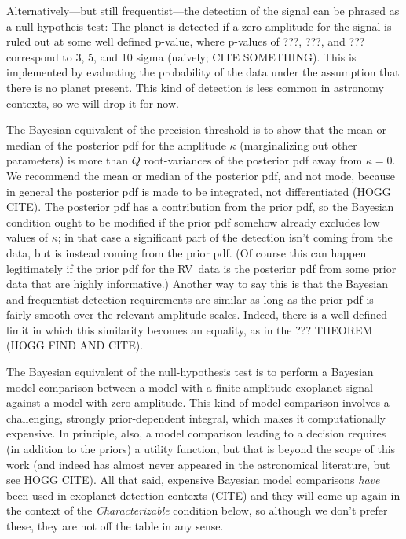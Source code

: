 \documentclass[modern]{aastex63}
\newcommand{\acronym}[1]{{\small{#1}}}
\newcommand{\rv}{\acronym{RV}}
\begin{document}
Alternatively---but still frequentist---the detection of the signal
can be phrased as a null-hypotheis test: The planet is detected if a
zero amplitude for the signal is ruled out at some well defined
p-value, where p-values of ???, ???, and ??? correspond to 3, 5, and
10 sigma (naively; CITE SOMETHING).
This is implemented by evaluating the probability of the data under
the assumption that there is no planet present.
This kind of detection is less common in astronomy contexts, so we will
drop it for now.

The Bayesian equivalent of the precision threshold is to show that the
mean or median of the posterior pdf for the amplitude $\kappa$
(marginalizing out other parameters) is more than $Q$ root-variances
of the posterior pdf away from $\kappa=0$.
We recommend the mean or median of the posterior pdf, and not mode,
because in general the posterior pdf is made to be integrated, not
differentiated (HOGG CITE).
The posterior pdf has a contribution from the prior pdf, so the Bayesian
condition ought to be modified if the prior pdf somehow already excludes
low values of $\kappa$; in that case a significant part of the detection
isn't coming from the data, but is instead coming from the prior pdf.
(Of course this can happen legitimately if the prior pdf for the \rv\ data
is the posterior pdf from some prior data that are highly informative.)
Another way to say this is that the Bayesian and frequentist detection
requirements are similar as long as the prior pdf is fairly smooth over
the relevant amplitude scales.
Indeed, there is a well-defined limit in which this similarity becomes
an equality, as in the ??? THEOREM (HOGG FIND AND CITE).

The Bayesian equivalent of the null-hypothesis test is to perform a
Bayesian model comparison between a model with a finite-amplitude
exoplanet signal against a model with zero amplitude.
This kind of model comparison involves a challenging, strongly
prior-dependent integral, which makes it computationally expensive.
In principle, also, a model comparison leading to a decision requires
(in addition to the priors) a utility function, but that is beyond the
scope of this work (and indeed has almost never appeared in the
astronomical literature, but see HOGG CITE).
All that said, expensive Bayesian model comparisons \emph{have} been
used in exoplanet detection contexts (CITE) and they will come up
again in the context of the \textsl{Characterizable} condition below,
so although we don't prefer these, they are not off the table in any
sense.
\end{document}
